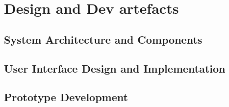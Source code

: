 \newpage\section{Design and Dev artefacts}

\subsection{System Architecture and Components}

\subsection{User Interface Design and Implementation}

\subsection{Prototype Development}
